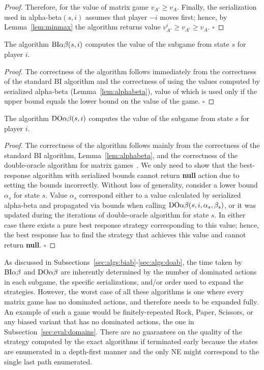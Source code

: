 {\begin{proof}
Therefore, for the value of matrix game $v_{A'} \geq v_A$. 
Finally, the serialization used in alpha-beta$(s, i)$ assumes that player $-i$ moves first; hence, by Lemma~\ref{lem:minmax} the algorithm returns value $v^i_{A'} \geq v_{A'} \geq v_{A}$. $\square$
\end{proof}
\begin{theorem}
The algorithm $\textrm{BI}\alpha\beta(s,i)$ computes the value of the subgame from state $s$ for player $i$.
\end{theorem}
\begin{proof}
The correctness of the algorithm follows immediately from the correctness of the standard BI algorithm and the correctness of using the values computed by serialized alpha-beta (Lemma~\ref{lem:alphabeta}), value of which is used only if the upper bound equals the lower bound on the value of the game. $\square$
\end{proof}
\begin{theorem}
The algorithm $\textrm{DO}\alpha\beta(s,i)$ computes the value of the subgame from state $s$ for player $i$.
\end{theorem}
\begin{proof}
The correctness of the algorithm follows mainly from the correctness of the standard BI algorithm, Lemma~\ref{lem:alphabeta}, and the correctness of the double-oracle algorithm for matrix games~\cite{McMahan03Planning}. 
We only need to show that the best-response algorithm with serialized bounds cannot return \textbf{null} action due to setting the bounds incorrectly. 
Without loss of generality, consider a lower bound $\alpha_s$ for state $s$.
Value $\alpha_s$ correspond either to a value calculated by serialized alpha-beta and propagated via bounds when calling $\textrm{DO}\alpha\beta(s,i,\alpha_s,\beta_s)$, or it was updated during the iterations of double-oracle algorithm for state $s$. 
In either case there exists a pure best response strategy corresponding to this value; hence, the best response has to find the strategy that achieves this value and cannot return \textbf{null}. $\square$
\end{proof}

As discussed in Subsections~\ref{sec:algs:biab}-\ref{sec:algs:doab}, the time taken by $\textrm{BI}\alpha\beta$ and $\textrm{DO}\alpha\beta$
are inherently determined by the number of dominated actions in each subgame, the specific serializations, and/or order used to expand the
strategies. However, the worst case of all these algorithms is one where every matrix game has no dominated actions, and therefore needs to be expanded fully.
An example of such a game would be finitely-repeated Rock, Paper, Scissors, or any biased variant that has no dominated actions, \eg the one
in Subsection~\ref{sec:eval:domains}.
There are no guarantees on the quality of the strategy computed by the exact algorithms if terminated early because the states are enumerated in a depth-first manner
and the only NE might correspond to the single last path enumerated.

}
